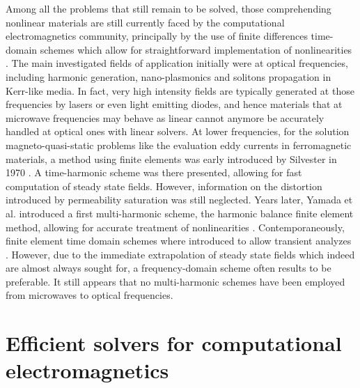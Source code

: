 Among all the problems that still remain to be solved, those comprehending nonlinear materials are still currently faced by the computational electromagnetics community, principally by the use of finite differences time-domain schemes which allow for straightforward implementation of nonlinearities \cite{goorjian1992direct, ziolkowski1993full, ziolkowski1994nonlinear, joseph1997fdtd, teixeira2008time, sasanpour2010analysis, potravkin2012numerical, frances2013split}. The main investigated fields of application initially were at optical frequencies, including harmonic generation, nano-plasmonics and solitons propagation in Kerr-like media. In fact, very high intensity fields are typically generated at those frequencies by lasers or even light emitting diodes, and hence materials that at microwave frequencies may behave as linear cannot anymore be accurately handled at optical ones with linear solvers. At lower frequencies, for the solution magneto-quasi-static problems like the evaluation eddy currents in ferromagnetic materials, a method using finite elements was early introduced by Silvester in 1970 \cite{silvester1970finite}. A time-harmonic scheme was there presented, allowing for fast computation of steady state fields. However, information on the distortion introduced by permeability saturation was still neglected. Years later, Yamada et al. \cite{yamada1988harmonic, yamada1989harmonic, yamada1991calculation} introduced a first multi-harmonic scheme, the harmonic balance finite element method, allowing for accurate treatment of nonlinearities \cite{gyselinck2002harmonic, pascal2003coupling, zhao2010analysis, zhao2011analysis}. Contemporaneously, finite element time domain schemes where introduced to allow transient analyzes \cite{biro1995various}. However, due to the immediate extrapolation of steady state fields which indeed are almost always sought for, a frequency-domain scheme often results to be preferable. It still appears that no multi-harmonic schemes have been employed from microwaves to optical frequencies.


\section{Efficient solvers for computational electromagnetics}

